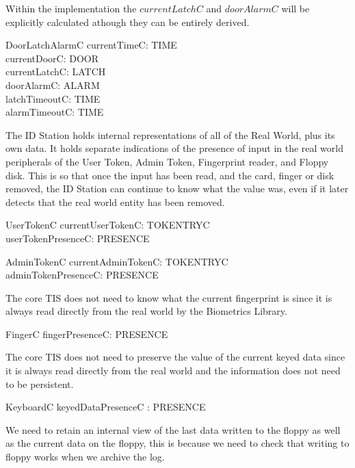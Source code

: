 Within the implementation the $currentLatchC$ and $doorAlarmC$ will
be explicitly calculated athough they can be entirely derived.

\begin{schema}{DoorLatchAlarmC}
	currentTimeC: TIME
\\	currentDoorC: DOOR
\\	currentLatchC: LATCH
\\	doorAlarmC: ALARM
\\	latchTimeoutC: TIME
\\	alarmTimeoutC: TIME
\end{schema}


The ID Station holds internal representations of all of the Real World,
plus its own data.
It holds separate indications of the presence of input in the real world peripherals
of the User Token, Admin Token, Fingerprint reader, and Floppy disk.
This is so that once the input has been read,
and the card, finger or disk removed,
the ID Station can continue to know what the value was,
even if it later detects that the real world entity has been removed.

\begin{schema}{UserTokenC}
	currentUserTokenC: TOKENTRYC
\\	userTokenPresenceC: PRESENCE
\end{schema}

\begin{schema}{AdminTokenC}
	currentAdminTokenC: TOKENTRYC
\\	adminTokenPresenceC: PRESENCE
\end{schema}

The core TIS does not need to know what the current fingerprint is
since it is always read directly from the real world by the 
Biometrics Library.

\begin{schema}{FingerC}
	fingerPresenceC: PRESENCE
\end{schema}

The core TIS does not need to preserve the value of the current keyed
data since it is always read directly from the real world and the
information does not need to be persistent.

\begin{schema}{KeyboardC}
      keyedDataPresenceC : PRESENCE
\end{schema}  


We need to retain an internal view of the last data written to the
floppy as well as the current data on the floppy, this is because we
need to check that writing to floppy works when we archive the log.

